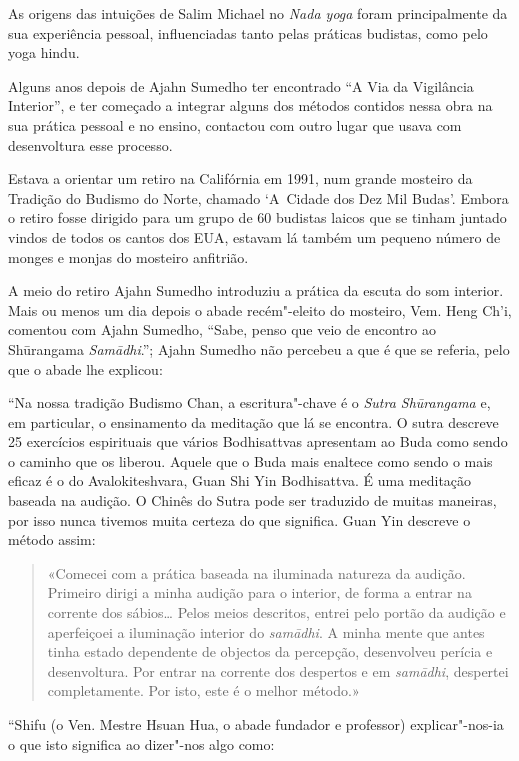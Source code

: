 As origens das intuições de Salim Michael no \emph{Nada yoga} foram
principalmente da sua experiência pessoal, influenciadas tanto pelas
práticas budistas, como pelo yoga hindu.

Alguns anos depois de Ajahn Sumedho ter encontrado ``A Via da Vigilância
Interior'', e ter começado a integrar alguns dos métodos contidos nessa
obra na sua prática pessoal e no ensino, contactou com outro lugar que
usava com desenvoltura esse processo.

Estava a orientar um retiro na Califórnia em 1991, num grande mosteiro
da Tradição do Budismo do Norte, chamado `A~Cidade dos Dez Mil Budas'.
Embora o retiro fosse dirigido para um grupo de 60 budistas laicos que
se tinham juntado vindos de todos os cantos dos EUA, estavam lá também
um pequeno número de monges e monjas do mosteiro anfitrião.

A meio do retiro Ajahn Sumedho introduziu a prática da escuta do som
interior. Mais ou menos um dia depois o abade recém"-eleito do mosteiro,
Vem. Heng Ch'i, comentou com Ajahn Sumedho, ``Sabe, penso que veio de
encontro ao Shūrangama \emph{Samādhi}.''; Ajahn Sumedho não percebeu a
que é que se referia, pelo que o abade lhe explicou:

``Na nossa tradição Budismo Chan, a escritura"-chave é o \emph{Sutra
Shūrangama} e, em particular, o ensinamento da meditação que lá se
encontra. O sutra descreve 25 exercícios espirituais que vários
Bodhisattvas apresentam ao Buda como sendo o caminho que os liberou.
Aquele que o Buda mais enaltece como sendo o mais eficaz é o do
Avalokiteshvara, Guan Shi Yin Bodhisattva. É uma meditação baseada na
audição. O Chinês do Sutra pode ser traduzido de muitas maneiras, por
isso nunca tivemos muita certeza do que significa. Guan Yin descreve o
método assim:

\begin{quotation}
«Comecei com a prática baseada na iluminada natureza da audição.
Primeiro dirigi a minha audição para o interior, de forma a entrar na
corrente dos sábios\ldots{} Pelos meios descritos, entrei pelo portão da
audição e aperfeiçoei a iluminação interior do \emph{samādhi}. A minha
mente que antes tinha estado dependente de objectos da percepção,
desenvolveu perícia e desenvoltura. Por entrar na corrente dos despertos
e em \emph{samādhi}, despertei completamente. Por isto, este é o melhor
método.»\cite{surangama}
\end{quotation}

``Shifu (o Ven. Mestre Hsuan Hua, o abade fundador e professor)
explicar"-nos-ia o que isto significa ao dizer"-nos algo como:

